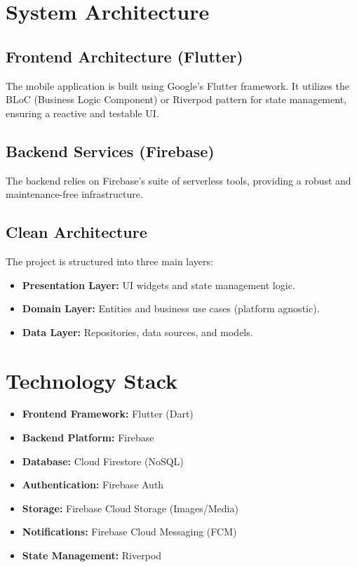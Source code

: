 \documentclass[12pt, a4paper]{report}
\begin{document}
\chapter{System Architecture}

\section{Frontend Architecture (Flutter)}
The mobile application is built using Google's Flutter framework. It utilizes the BLoC (Business Logic Component) or Riverpod pattern for state management, ensuring a reactive and testable UI.

\section{Backend Services (Firebase)}
The backend relies on Firebase's suite of serverless tools, providing a robust and maintenance-free infrastructure.

\section{Clean Architecture}
The project is structured into three main layers:
\begin{itemize}
    \item \textbf{Presentation Layer:} UI widgets and state management logic.
    \item \textbf{Domain Layer:} Entities and business use cases (platform agnostic).
    \item \textbf{Data Layer:} Repositories, data sources, and models.
\end{itemize}

\chapter{Technology Stack}

\begin{itemize}
    \item \textbf{Frontend Framework:} Flutter (Dart)
    \item \textbf{Backend Platform:} Firebase
    \item \textbf{Database:} Cloud Firestore (NoSQL)
    \item \textbf{Authentication:} Firebase Auth
    \item \textbf{Storage:} Firebase Cloud Storage (Images/Media)
    \item \textbf{Notifications:} Firebase Cloud Messaging (FCM)
    \item \textbf{State Management:} Riverpod
\end{itemize}
\end{document}
